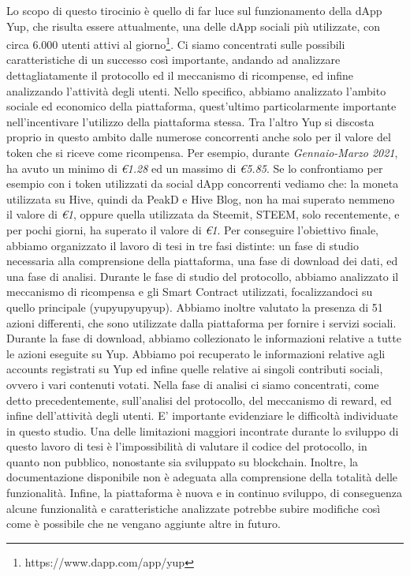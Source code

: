 Lo scopo di questo tirocinio è quello di far luce sul funzionamento della dApp Yup, che risulta essere attualmente, una delle dApp sociali più utilizzate, con circa 6.000 utenti attivi al giorno\footnote{https://www.dapp.com/app/yup}. Ci siamo concentrati sulle possibili caratteristiche di un successo così importante, andando ad analizzare dettagliatamente il protocollo ed il meccanismo di ricompense, ed infine analizzando l'attività degli utenti. Nello specifico, abbiamo analizzato l'ambito sociale ed economico della piattaforma, quest'ultimo particolarmente importante nell'incentivare l'utilizzo della piattaforma stessa. Tra l'altro Yup si discosta proprio in questo ambito dalle numerose concorrenti anche solo per il valore del token che si riceve come ricompensa. Per esempio, durante \textit{Gennaio-Marzo 2021}, ha avuto un minimo di \textit{\euro1.28} ed un massimo di \textit{\euro5.85}. Se lo confrontiamo per esempio con i token utilizzati da social dApp concorrenti vediamo che: la moneta utilizzata su Hive, quindi da PeakD e Hive Blog, non ha mai superato nemmeno il valore di \textit{\euro1}, oppure quella utilizzata da Steemit, STEEM, solo recentemente, e per pochi giorni, ha superato il valore di \textit{\euro1}. Per conseguire l'obiettivo finale, abbiamo organizzato il lavoro di tesi in tre fasi distinte: un fase di studio necessaria alla comprensione della piattaforma, una fase di download dei dati, ed una fase di analisi. Durante le fase di studio del protocollo, abbiamo analizzato il meccanismo di ricompensa e gli Smart Contract utilizzati, focalizzandoci su quello principale (yupyupyupyup). Abbiamo inoltre valutato la presenza di 51 azioni differenti, che sono utilizzate dalla piattaforma per fornire i servizi sociali. Durante la fase di download, abbiamo collezionato le informazioni relative a tutte le azioni eseguite su Yup. Abbiamo poi recuperato le informazioni relative agli accounts registrati su Yup ed infine quelle relative ai singoli contributi sociali, ovvero i vari contenuti votati.
Nella fase di analisi ci siamo concentrati, come detto precedentemente, sull'analisi del protocollo, del meccanismo di reward, ed infine dell'attività degli utenti.
E' importante evidenziare le difficoltà individuate in questo studio. Una delle limitazioni maggiori incontrate durante lo sviluppo di questo lavoro di tesi è l'impossibilità di valutare il codice del protocollo, in quanto non pubblico, nonostante sia sviluppato su blockchain. Inoltre, la documentazione disponibile non è adeguata alla comprensione della totalità delle funzionalità. Infine, la piattaforma è nuova e in continuo sviluppo, di conseguenza alcune funzionalità e caratteristiche analizzate potrebbe subire modifiche così come è possibile che ne vengano aggiunte altre in futuro.

